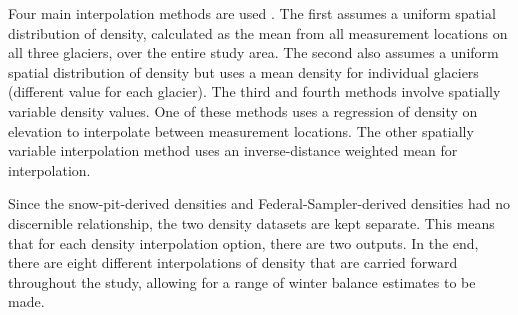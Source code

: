 \documentclass{sfuthesis}
\begin{document}
Four main interpolation methods are used \citep{McGrath2015, Elder1991}. The first assumes a uniform spatial distribution of density, calculated as the mean from all measurement locations on all three glaciers, over the entire study area. The second  also assumes a uniform spatial distribution of density but uses a mean density for individual glaciers (different value for each glacier). The third and fourth methods involve spatially variable density values. One of these methods uses a regression of density on elevation to interpolate between measurement locations. The other spatially variable interpolation method uses an inverse-distance weighted mean for interpolation. 

Since the snow-pit-derived densities and Federal-Sampler-derived densities had no discernible relationship, the two density datasets are kept separate. This means that for each density interpolation option, there are two outputs. In the end, there are eight different interpolations of density that are carried forward throughout the study, allowing for a range of winter balance estimates to be made. 
\end{document}
